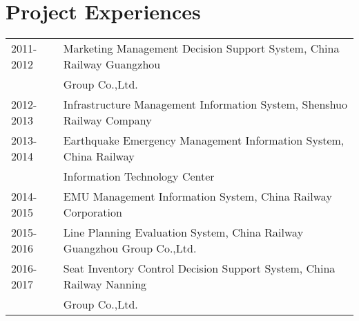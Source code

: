 \documentclass[a4paper,10pt]{article} %
\begin{document}
\section{Project Experiences}

\begin{tabular}{ll}
2011-2012 & Marketing Management Decision Support System, China Railway Guangzhou\\
		  & Group Co.,Ltd.\\
2012-2013 & Infrastructure Management Information System, Shenshuo Railway Company\\
2013-2014 & Earthquake Emergency Management Information System, China Railway\\
		  & Information Technology Center \\
2014-2015 & EMU Management Information System, China Railway Corporation\\
2015-2016 & Line Planning Evaluation System, China Railway Guangzhou Group Co.,Ltd.\\
2016-2017 & Seat Inventory Control Decision Support System, China Railway Nanning\\
          & Group Co.,Ltd.\\

\end{tabular}
\end{document}
